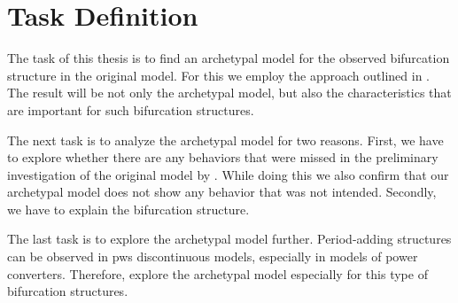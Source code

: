 \chapter{Task Definition}
\label{chap:task}

The task of this thesis is to find an archetypal model for the observed bifurcation structure in the original model.
For this we employ the approach outlined in .
The result will be not only the archetypal model, but also the characteristics that are important for such bifurcation structures.

The next task is to analyze the archetypal model for two reasons.
First, we have to explore whether there are any behaviors that were missed in the preliminary investigation of the original model by .
While doing this we also confirm that our archetypal model does not show any behavior that was not intended.
Secondly, we have to explain the bifurcation structure.

The last task is to explore the archetypal model further.
Period-adding structures can be observed in \gls{pws} discontinuous models, especially in models of power converters.
Therefore, explore the archetypal model especially for this type of bifurcation structures.
